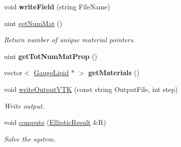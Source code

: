 \begin{DoxyCompactItemize}
\item 
\hypertarget{classvoom_1_1_gauge_model_af7a7f5dbbf3ca9e9c4614d8837d8215e}{
void {\bfseries writeField} (string FileName)}
\label{classvoom_1_1_gauge_model_af7a7f5dbbf3ca9e9c4614d8837d8215e}

\item 
\hypertarget{classvoom_1_1_gauge_model_a40c5984b59544fcc03d0abd3e0354e62}{
uint \hyperlink{classvoom_1_1_gauge_model_a40c5984b59544fcc03d0abd3e0354e62}{getNumMat} ()}
\label{classvoom_1_1_gauge_model_a40c5984b59544fcc03d0abd3e0354e62}

\begin{DoxyCompactList}\small\item\em Return number of unique material pointers. \item\end{DoxyCompactList}\item 
\hypertarget{classvoom_1_1_gauge_model_a6f7c842df251c1973ea627360d09edc2}{
uint {\bfseries getTotNumMatProp} ()}
\label{classvoom_1_1_gauge_model_a6f7c842df251c1973ea627360d09edc2}

\item 
\hypertarget{classvoom_1_1_gauge_model_a89aa4c3bf7114d84c42a58ce527b5d25}{
vector$<$ \hyperlink{classvoom_1_1_gauge_lipid}{GaugeLipid} $\ast$ $>$ {\bfseries getMaterials} ()}
\label{classvoom_1_1_gauge_model_a89aa4c3bf7114d84c42a58ce527b5d25}

\item 
\hypertarget{classvoom_1_1_gauge_model_afbb8fb2f7dd919c8d2082f85a2062033}{
void \hyperlink{classvoom_1_1_gauge_model_afbb8fb2f7dd919c8d2082f85a2062033}{writeOutputVTK} (const string OutputFile, int step)}
\label{classvoom_1_1_gauge_model_afbb8fb2f7dd919c8d2082f85a2062033}

\begin{DoxyCompactList}\small\item\em Write output. \item\end{DoxyCompactList}\item 
\hypertarget{classvoom_1_1_gauge_model_a831e2c32bc321c1b0ad1aa12e01806a1}{
void \hyperlink{classvoom_1_1_gauge_model_a831e2c32bc321c1b0ad1aa12e01806a1}{compute} (\hyperlink{structvoom_1_1_elliptic_result}{EllipticResult} \&R)}
\label{classvoom_1_1_gauge_model_a831e2c32bc321c1b0ad1aa12e01806a1}

\begin{DoxyCompactList}\small\item\em Solve the system. \item\end{DoxyCompactList}\end{DoxyCompactItemize}
